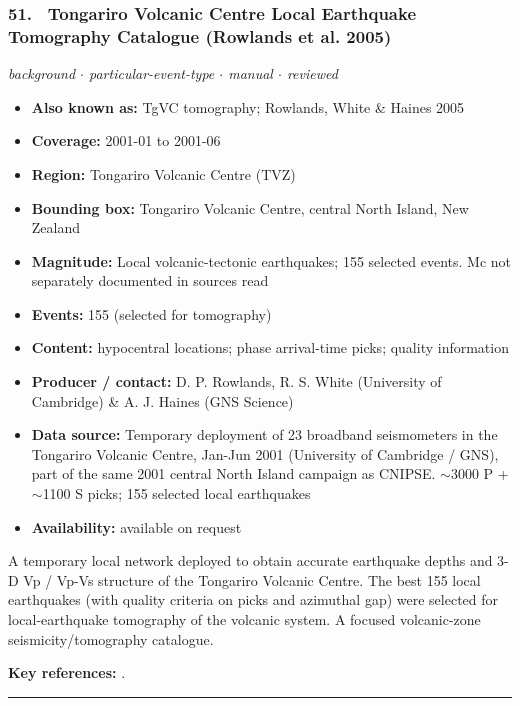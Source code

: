 \documentclass[10pt,a4paper]{article}
\newcommand{\catentryrule}{\par\vspace{3pt}\noindent\textcolor{rulegrey}{\rule{\linewidth}{0.3pt}}\par\vspace{5pt}}
\newcommand{\kv}[2]{\item \textbf{#1:} #2}
\begin{document}
\subsubsection*{\hypertarget{c:51}{51.}~ Tongariro Volcanic Centre Local Earthquake Tomography Catalogue (Rowlands et al. 2005)}
{\small\itshape background $\cdot$ particular-event-type $\cdot$ manual $\cdot$ reviewed}\par\vspace{2pt}
\begin{itemize}[leftmargin=1.3em,itemsep=0.6pt,topsep=1pt,parsep=0pt]
\kv{Also known as}{TgVC tomography; Rowlands, White \& Haines 2005}
\kv{Coverage}{2001-01 to 2001-06}
\kv{Region}{Tongariro Volcanic Centre (TVZ)}
\kv{Bounding box}{Tongariro Volcanic Centre, central North Island, New Zealand}
\kv{Magnitude}{Local volcanic-tectonic earthquakes; 155 selected events. Mc not separately documented in sources read}
\kv{Events}{155 (selected for tomography)}
\kv{Content}{hypocentral locations; phase arrival-time picks; quality information}
\kv{Producer / contact}{D. P. Rowlands, R. S. White (University of Cambridge) \& A. J. Haines (GNS Science)}
\kv{Data source}{Temporary deployment of 23 broadband seismometers in the Tongariro Volcanic Centre, Jan-Jun 2001 (University of Cambridge / GNS), part of the same 2001 central North Island campaign as CNIPSE. $\sim$3000 P + $\sim$1100 S picks; 155 selected local earthquakes}
\kv{Availability}{available on request}
\end{itemize}
\par\vspace{2pt}A temporary local network deployed to obtain accurate earthquake depths and 3-D Vp / Vp-Vs structure of the Tongariro Volcanic Centre. The best 155 local earthquakes (with quality criteria on picks and azimuthal gap) were selected for local-earthquake tomography of the volcanic system. A focused volcanic-zone seismicity/tomography catalogue.
\par\vspace{2pt}\textbf{Key references:} \cite{Rowlands2005}.
\catentryrule
\end{document}
